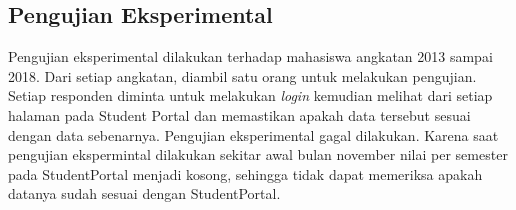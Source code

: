 \subsection{Pengujian Eksperimental}
Pengujian eksperimental dilakukan terhadap mahasiswa angkatan 2013 sampai 2018. Dari setiap angkatan, diambil satu orang untuk melakukan pengujian. Setiap responden diminta untuk melakukan \textit{login} kemudian melihat dari setiap halaman pada Student Portal dan memastikan apakah data tersebut sesuai dengan data sebenarnya. Pengujian eksperimental gagal dilakukan. Karena saat pengujian ekspermintal dilakukan sekitar awal bulan november nilai per semester pada StudentPortal menjadi kosong, sehingga tidak dapat memeriksa apakah datanya sudah sesuai dengan StudentPortal. 